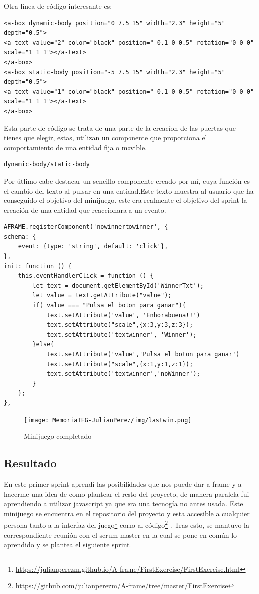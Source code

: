 \documentclass[a4paper, 12pt]{book}
\begin{document}
Otra línea de código interesante es:
\begin{verbatim}
<a-box dynamic-body position="0 7.5 15" width="2.3" height="5" 
depth="0.5">
<a-text value="2" color="black" position="-0.1 0 0.5" rotation="0 0 0" 
scale="1 1 1"></a-text>
</a-box>
<a-box static-body position="-5 7.5 15" width="2.3" height="5" 
depth="0.5">
<a-text value="1" color="black" position="-0.1 0 0.5" rotation="0 0 0" 
scale="1 1 1"></a-text>
</a-box>
\end{verbatim} 

Esta parte de código se trata de una parte de la creacíon de las puertas que tienes que elegir, estas, utilizan un componente que proporciona el comportamiento de una entidad fija o movible.\begin{verbatim}dynamic-body/static-body \end{verbatim}

Por útlimo cabe destacar un sencillo componente creado por mí, cuya función es el cambio del texto al pulsar en una entidad.Este texto muestra al usuario que ha conseguido el objetivo del minijuego.  este era realmente el objetivo del sprint la creación de una entidad que reaccionara a un evento.
\begin{verbatim}
AFRAME.registerComponent('nowinnertowinner', {
schema: {
    event: {type: 'string', default: 'click'},
},
init: function () {
    this.eventHandlerClick = function () {
        let text = document.getElementById('WinnerTxt');
        let value = text.getAttribute("value");
        if( value === "Pulsa el boton para ganar"){
            text.setAttribute('value', 'Enhorabuena!!')
            text.setAttribute("scale",{x:3,y:3,z:3});
            text.setAttribute('textwinner', 'Winner');
        }else{
            text.setAttribute('value','Pulsa el boton para ganar')
            text.setAttribute("scale",{x:1,y:1,z:1});
            text.setAttribute('textwinner','noWinner');
        }
    };
},
\end{verbatim} 

         \begin{figure}[H]
  \centering
  \texttt{[image: MemoriaTFG-JulianPerez/img/lastwin.png]}
  \caption{Minijuego completado}\label{scrum}
\end{figure}

\subsection{Resultado}
En este primer sprint aprendí las posibilidades que nos puede dar a-frame y a hacerme una idea de como plantear el resto del proyecto, de manera paralela fui aprendiendo a utilizar javascript ya que era una tecnogía no antes usada. Este minijuego se encuentra en el repositorio del proyecto y esta accesible a cualquier persona tanto a la interfaz del juego\footnote{\url{https://julianperezm.github.io/A-frame/FirstExercise/FirstExercise.html}}  como al código\footnote{\url{https://github.com/julianperezm/A-frame/tree/master/FirstExercise}} . Tras esto, se mantuvo la correspondiente reunión con el scrum master en la cual se pone en común lo aprendido y se plantea el siguiente sprint.
\end{document}
